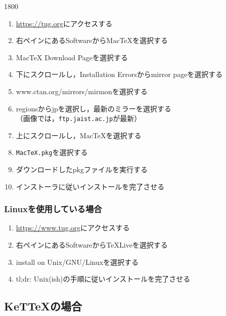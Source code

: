 \begin{layer}{180}{0}
\end{layer}
\begin{enumerate}
    \item \url{https://tug.org}にアクセスする
    \item 右ペインにあるSoftwareからMacTeXを選択する
    \item MacTeX Download Pageを選択する
    \item 下にスクロールし，Installation Errorsからmirror pageを選択する
    \item www.ctan.org/mirrors/mirmonを選択する
    \item regionsからjpを選択し，最新のミラーを選択する\\
          （画像では，\verb|ftp.jaist.ac.jp|が最新）
    \item 上にスクロールし，MacTeXを選択する
    \item \verb|MacTeX.pkg|を選択する
    \item ダウンロードしたpkgファイルを実行する
    \item インストーラに従いインストールを完了させる
\end{enumerate}

\subsubsection{Linuxを使用している場合}
\begin{enumerate}
    \item \url{https://www.tug.org}にアクセスする
    \item 右ペインにあるSoftwareからTeXLiveを選択する
    \item install on Unix/GNU/Linuxを選択する
    \item tl;dr: Unix(ish)の手順に従いインストールを完了させる
\end{enumerate}

\subsection{KeT{\TeX}の場合}

